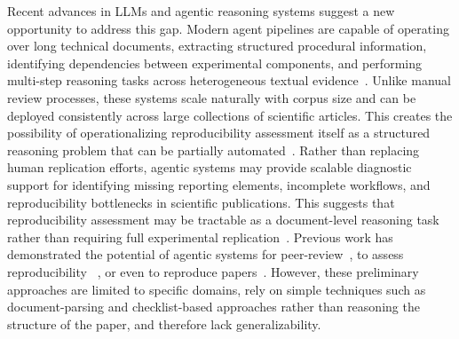 \documentclass{article}
\begin{document}
Recent advances in LLMs and agentic reasoning systems suggest a new opportunity to address this gap. 
Modern agent pipelines are capable of operating over long technical documents, extracting structured procedural information, identifying dependencies between experimental components, and performing multi-step reasoning tasks across heterogeneous textual evidence~\citep{acharya2025agentic}. 
Unlike manual review processes, these systems scale naturally with corpus size and can be deployed consistently across large collections of scientific articles. 
This creates the possibility of operationalizing reproducibility assessment itself as a structured reasoning problem that can be partially automated~\citep{li2025generation}.
Rather than replacing human replication efforts, agentic systems may provide scalable diagnostic support for identifying missing reporting elements, incomplete workflows, and reproducibility bottlenecks in scientific publications.
This suggests that reproducibility assessment may be tractable as a document-level reasoning task rather than requiring full experimental replication~\citep{jin2024agentreview,thakkar2025can}.
Previous work has demonstrated the potential of agentic systems for peer-review~\citep{liang2024can,hossain2025llms,zhuang2025large}, to assess reproducibility ~\citep{hu2025repro,nguyen2026replicatorbench}, or even to reproduce papers~\citep{kim2025reproduction,seo2025paper2code}. However, these preliminary approaches are limited to specific domains, rely on simple techniques such as document-parsing and checklist-based approaches rather than reasoning the structure of the paper, and therefore lack generalizability. 
\end{document}
